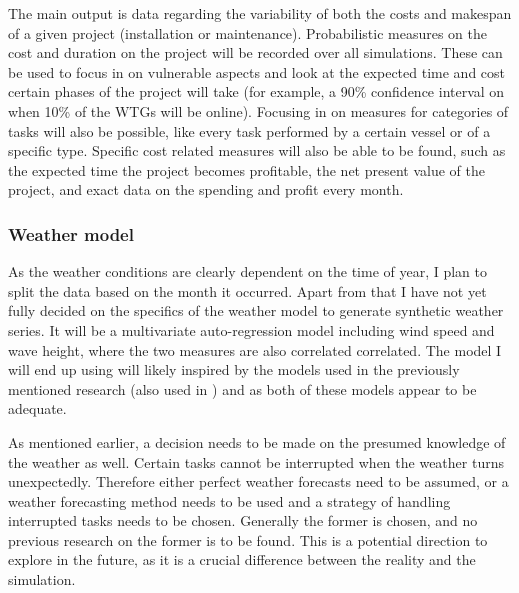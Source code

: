 \documentclass[a4paper,12pt]{article}
\begin{document}
The main output is data regarding the variability of both the costs and makespan of a given project (installation or maintenance). Probabilistic measures on the cost and duration on the project will be recorded over all simulations. These can be used to focus in on vulnerable aspects and look at the expected time and cost certain phases of the project will take (for example, a 90\% confidence interval on when 10\% of the WTGs will be online). Focusing in on measures for categories of tasks will also be possible, like every task performed by a certain vessel or of a specific type. Specific cost related measures will also be able to be found, such as the expected time the project becomes profitable, the net present value of the project, and exact data on the spending and profit every month. 

\subsubsection{Weather model} \label{sss:wemo}
As the weather conditions are clearly dependent on the time of year, I plan to split the data based on the month it occurred. Apart from that I have not yet fully decided on the specifics of the weather model to generate synthetic weather series. It will be a multivariate auto-regression model including wind speed and wave height, where the two measures are also correlated correlated. The model I will end up using will likely inspired by the models used in the previously mentioned research \cite{dinwoodie2014operational} (also used in \cite{barlow2018mixed}) and \cite{kerkhove2017optimised} as both of these models appear to be adequate.

As mentioned earlier, a decision needs to be made on the presumed knowledge of the weather as well. Certain tasks cannot be interrupted when the weather turns unexpectedly. Therefore either perfect weather forecasts need to be assumed, or a weather forecasting method needs to be used and a strategy of handling interrupted tasks needs to be chosen. Generally the former is chosen, and no previous research on the former is to be found. This is a potential direction to explore in the future, as it is a crucial difference between the reality and the simulation. 


\pagebreak
\end{document}
